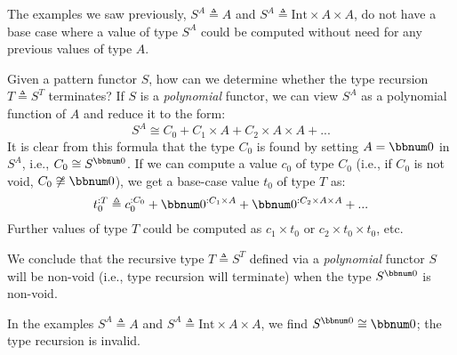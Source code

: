The examples we saw previously, $S^{A}\triangleq A$ and $S^{A}\triangleq\text{Int}\times A\times A$,
do not have a base case where a value of type $S^{A}$ could be computed
without need for any previous values of type $A$. 

Given a pattern functor $S$, how
can we determine whether the type recursion $T\triangleq S^{T}$ terminates?
If $S$ is a \emph{polynomial} functor, we can view $S^{A}$ as a
polynomial function of $A$ and reduce it to the form:
\begin{equation}
S^{A}\cong C_{0}+C_{1}\times A+C_{2}\times A\times A+...\label{eq:functor-polynomial-normal-form}
\end{equation}
It is clear from this formula that the type $C_{0}$ is found by setting
$A=\bbnum 0$ in $S^{A}$, i.e., $C_{0}\cong S^{\bbnum 0}$. If we
can compute a value $c_{0}$ of type $C_{0}$ (i.e., if $C_{0}$ is
not void, $C_{0}\not\cong\bbnum 0$), we get a base-case value $t_{0}$
of type $T$ as:
\[
t_{0}^{:T}\triangleq c_{0}^{:C_{0}}+\bbnum 0^{:C_{1}\times A}+\bbnum 0^{:C_{2}\times A\times A}+...
\]
Further values of type $T$ could be computed as $c_{1}\times t_{0}$
or $c_{2}\times t_{0}\times t_{0}$, etc.

We conclude that the recursive type $T\triangleq S^{T}$ defined via
a \emph{polynomial} functor $S$ will be non-void (i.e., type recursion
will terminate) when the type $S^{\bbnum 0}$ is non-void.

In the examples $S^{A}\triangleq A$ and $S^{A}\triangleq\text{Int}\times A\times A$,
we find $S^{\bbnum 0}\cong\bbnum 0$; the type recursion is invalid.

